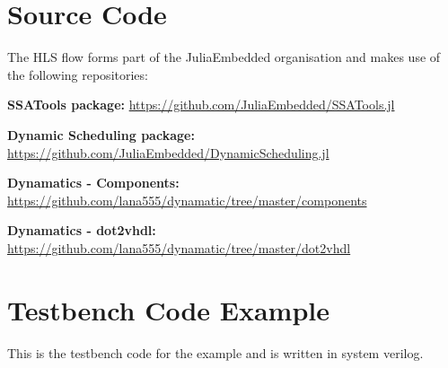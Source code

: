 \chapter{Source Code}
\label{app:src_code}
The HLS flow forms part of the JuliaEmbedded organisation and makes use of the following repositories:

\textbf{SSATools package:} \url{https://github.com/JuliaEmbedded/SSATools.jl}

\textbf{Dynamic Scheduling package:} \url{https://github.com/JuliaEmbedded/DynamicScheduling.jl}

\textbf{Dynamatics - Components:} \url{https://github.com/lana555/dynamatic/tree/master/components}

\textbf{Dynamatics - dot2vhdl:} \url{https://github.com/lana555/dynamatic/tree/master/dot2vhdl}


\chapter{Testbench Code Example}
\label{app:tb_eg}
This is the testbench code for the  example and is written in system verilog.

